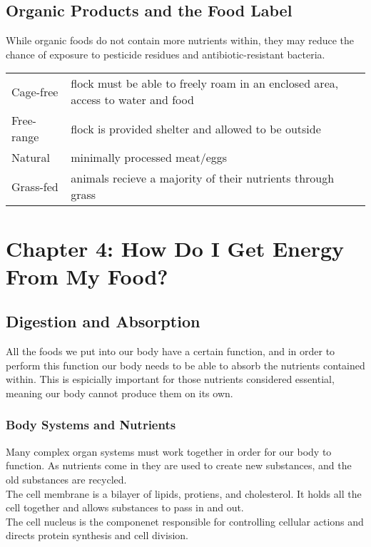 \documentclass[letterpaper, 11pt]{article}
\begin{document}
\subsection{Organic Products and the Food Label}
\label{sec:org9c8caf9}
While organic foods do not contain more nutrients within, they may reduce the chance of exposure to pesticide residues and antibiotic-resistant bacteria.\\
\begin{center}
\begin{tabular}{ll}
Cage-free & flock must be able to freely roam in an enclosed area, access to water and food\\
Free-range & flock is provided shelter and allowed to be outside\\
Natural & minimally processed meat/eggs\\
Grass-fed & animals recieve a majority of their nutrients through grass\\
\end{tabular}
\end{center}
\section{Chapter 4: How Do I Get Energy From My Food?}
\label{sec:org6eee560}
\subsection{Digestion and Absorption}
\label{sec:org18d7a1f}
All the foods we put into our body have a certain function, and in order to perform this function our body needs to be able to absorb the nutrients contained within. This is espicially important for those nutrients considered essential, meaning our body cannot produce them on its own.\\
\subsubsection{Body Systems and Nutrients}
\label{sec:orgb28fad0}
Many complex organ systems must work together in order for our body to function. As nutrients come in they are used to create new substances, and the old substances are recycled.\\
The cell membrane is a bilayer of lipids, protiens, and cholesterol. It holds all the cell together and allows substances to pass in and out.\\
The cell nucleus is the componenet responsible for controlling cellular actions and directs protein synthesis and cell division.\\
\end{document}
